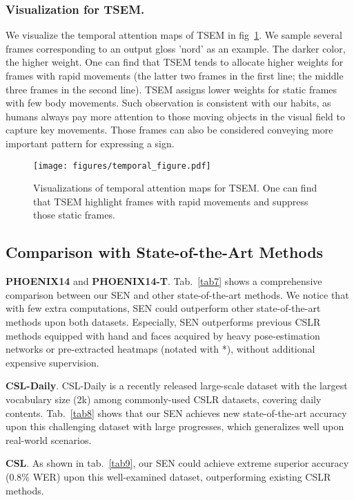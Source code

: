 \documentclass[letterpaper]{article} \usepackage{aaai23}  \usepackage{times}  \usepackage{helvet}  \usepackage{courier}  \usepackage[hyphens]{url}  \usepackage{graphicx} \urlstyle{rm} \def\UrlFont{\rm}  \usepackage{natbib}  \usepackage{caption} \frenchspacing  \setlength{\pdfpagewidth}{8.5in} \setlength{\pdfpageheight}{11in} \usepackage{algorithm}
\begin{document}
\subsubsection{Visualization for TSEM.} We visualize the temporal attention maps of TSEM in fig~\ref{fig6}. We sample several frames corresponding to an output gloss 'nord' as an example. The darker color, the higher weight. One can find that TSEM tends to allocate higher weights for frames with rapid movements (the latter two frames in the first line; the middle three frames in the second line). TSEM assigns lower weights for static frames with few body movements. Such observation is consistent with our habits, as humans always pay more attention to those moving objects in the visual field to capture key movements. Those frames can also be considered conveying more important pattern for expressing a sign.

\begin{figure}[t]
  \centering
  \texttt{[image: figures/temporal\_figure.pdf]}
  \caption{Visualizations of temporal attention maps for TSEM. One can find that TSEM highlight frames with rapid movements and suppress those static frames.}
  \label{fig6}
  \end{figure} 

\subsection{Comparison with State-of-the-Art Methods}
\textbf{PHOENIX14} and \textbf{PHOENIX14-T}. Tab.~\ref{tab7} shows a comprehensive comparison between our SEN and other state-of-the-art methods. We notice that with few extra computations, SEN could outperform other state-of-the-art methods upon both datasets. Especially, SEN outperforms previous CSLR methods equipped with hand and faces acquired by heavy pose-estimation networks or pre-extracted heatmaps (notated with *), without additional expensive supervision. 

\textbf{CSL-Daily}. CSL-Daily is a recently released large-scale dataset with the largest vocabulary size (2k) among commonly-used CSLR datasets, covering daily contents. Tab.~\ref{tab8} shows that our SEN achieves new state-of-the-art accuracy upon this challenging dataset with large progresses, which generalizes well upon real-world scenarios.

\textbf{CSL}. As shown in tab.~\ref{tab9}, our SEN could achieve extreme superior accuracy (0.8\% WER) upon this well-examined dataset, outperforming existing CSLR methods.
 
\end{document}
